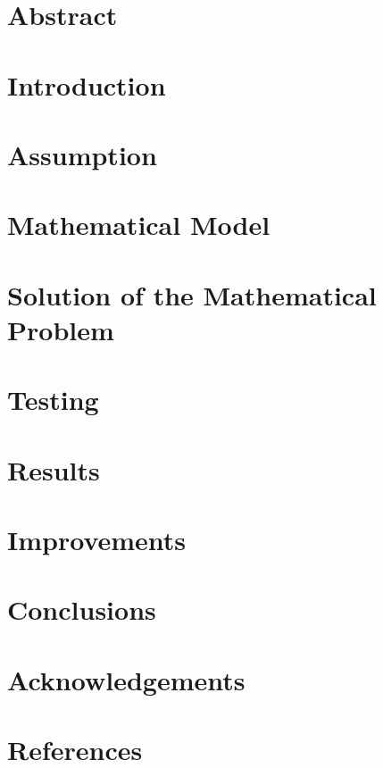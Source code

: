 \documentclass{article}
\begin{document}
\section{Abstract}
\section{Introduction}
\section{Assumption}
\section{Mathematical Model}
\section{Solution of the Mathematical Problem}
\section{Testing}
\section{Results}
\section{Improvements}
\section{Conclusions}
\section{Acknowledgements}
\section{References}
\end{document}
